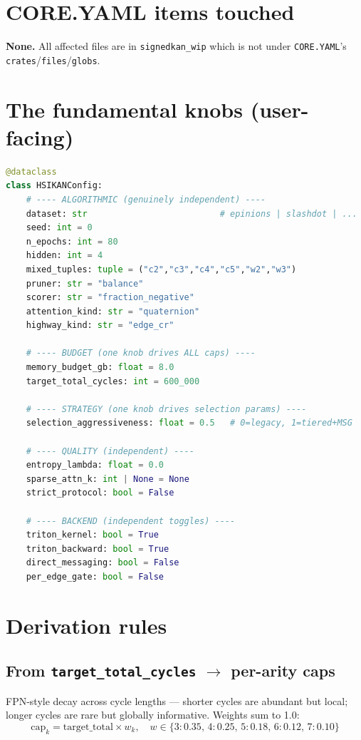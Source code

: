\documentclass[11pt,a4paper]{article}
\begin{document}
\section{CORE.YAML items touched}
\textbf{None.}  All affected files are in \texttt{signedkan\_wip} which
is not under \texttt{CORE.YAML}'s \texttt{crates}/\texttt{files}/\texttt{globs}.

\section{The fundamental knobs (user-facing)}
\begin{lstlisting}[language=python]
@dataclass
class HSIKANConfig:
    # ---- ALGORITHMIC (genuinely independent) ----
    dataset: str                          # epinions | slashdot | ...
    seed: int = 0
    n_epochs: int = 80
    hidden: int = 4
    mixed_tuples: tuple = ("c2","c3","c4","c5","w2","w3")
    pruner: str = "balance"
    scorer: str = "fraction_negative"
    attention_kind: str = "quaternion"
    highway_kind: str = "edge_cr"

    # ---- BUDGET (one knob drives ALL caps) ----
    memory_budget_gb: float = 8.0
    target_total_cycles: int = 600_000

    # ---- STRATEGY (one knob drives selection params) ----
    selection_aggressiveness: float = 0.5   # 0=legacy, 1=tiered+MSG

    # ---- QUALITY (independent) ----
    entropy_lambda: float = 0.0
    sparse_attn_k: int | None = None
    strict_protocol: bool = False

    # ---- BACKEND (independent toggles) ----
    triton_kernel: bool = True
    triton_backward: bool = True
    direct_messaging: bool = False
    per_edge_gate: bool = False
\end{lstlisting}

\section{Derivation rules}

\subsection*{From \texttt{target\_total\_cycles} $\rightarrow$ per-arity caps}
FPN-style decay across cycle lengths --- shorter cycles are abundant
but local; longer cycles are rare but globally informative.  Weights
sum to 1.0:
\[ \text{cap}_k = \text{target\_total} \times w_k, \quad
   w \in \{3{:}0.35,\, 4{:}0.25,\, 5{:}0.18,\, 6{:}0.12,\, 7{:}0.10\} \]
\end{document}
